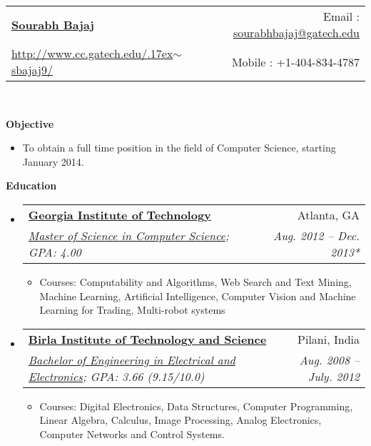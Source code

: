 \documentclass[letterpaper,9pt]{article}
\makeatletter
\newcommand{\resitem}[1]{\item #1 \vspace{-2pt}}
\newcommand{\resheading}[1]{{ \colorbox{mygrey}{\begin{minipage}{\textwidth}{\textbf{#1 \vphantom{p\^{E}}}}\end{minipage}}}}
\newcommand{\ressubheading}[4]{
\begin{tabular*}{6.5in}{l@{\extracolsep{\fill}}r}
        \textbf{#1} & #2 \\
        \textit{\small#3} & \textit{\small#4} \\
\end{tabular*}\vspace{-6pt}}
\makeatother
\begin{document}
\newcommand{\mywebheader}{
\begin{tabular*}{7in}{l@{\extracolsep{\fill}}r}
    \textbf{\href{http://www.cc.gatech.edu/~sbajaj9/}{\Large Sourabh Bajaj}} & Email : \href{mailto:sourabhbajaj@gatech.edu}{sourabhbajaj@gatech.edu}\\
    \href{http://www.cc.gatech.edu/~sbajaj9/}{http://www.cc.gatech.edu/{\raise.17ex\hbox{$\scriptstyle\sim$}}sbajaj9/} & Mobile : \hspace{30pt} +1-404-834-4787
    \end{tabular*}
\\
\vspace{0.1in}}

\mywebheader
\vspace{8pt}
\resheading{Objective}
	\vspace{-13pt}
	\begin{itemize}
		\item{ To obtain a full time position in the field of Computer Science, starting January 2014. }
	\end{itemize} %
	
\resheading{Education}
	\vspace{-10pt}
	\begin{itemize}
		\item
			\ressubheading{\href{http://www.gatech.edu}{Georgia Institute of Technology}}{Atlanta, GA}{\href{http://www.cc.gatech.edu}{Master of Science in Computer Science}; 
			{GPA: 4.00}}{Aug. 2012 -- Dec. 2013*}
				{ \footnotesize
				\begin{itemize}
					\resitem{\small Courses: Computability and Algorithms, Web Search and Text Mining, Machine Learning, Artificial Intelligence, Computer Vision and Machine Learning for Trading, Multi-robot systems}
				\end{itemize}
				}
		\item
			\ressubheading{\href{http://www.bits-pilani.ac.in}{Birla Institute of Technology and Science}}{Pilani, India}{\href{http://www.bits-pilani.ac.in/pilani/ElectricalElectronicsInstrumentation/Home}{Bachelor of Engineering in Electrical and Electronics}; 
			{GPA: 3.66 (9.15/10.0)}}{Aug. 2008 -- July. 2012}
				{ \small
				\begin{itemize}
					\resitem{Courses: Digital Electronics, Data Structures, Computer Programming, Linear Algebra, Calculus, Image Processing, Analog Electronics, Computer Networks and Control Systems.}
	\end{itemize} %
}\end{itemize}
\end{document}
